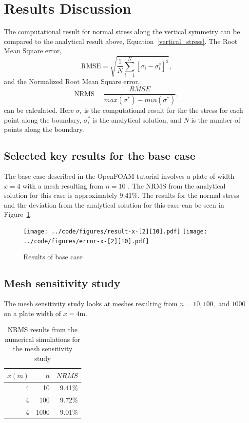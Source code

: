 \documentclass[twocolumn,10pt]{asme2ej}
\begin{document}
\section{Results Discussion}
The computational result for normal stress along the vertical symmetry can be compared to the analytical result above, Equation~\ref{vertical_stress}. The Root Mean Square error,
\begin{equation}
\mbox{RMSE} = \sqrt{\frac{1}{N}\sum\limits_{i=1}^N[\sigma_i - \sigma^*_i]^2},
\end{equation}
and the Normalized Root Mean Square error,
\begin{equation}
\mbox{NRMS} = \dfrac{RMSE}{max(\sigma^*)-min(\sigma^*)},
\end{equation}
can be calculated. Here $\sigma_i$ is the computational result for the the stress for each point along the boundary, $\sigma^*_i$ is the analytical solution, and $N$ is the number of points along the boundary.

\subsection{Selected key results for the base case}
The base case described in the OpenFOAM tutorial involves a plate of width $x = 4$ with a mesh resulting from $n = 10$ \cite{ctfm_1}. The NRMS from the analytical solution for this case is approximately 9.41\%. The results for the normal stress and the deviation from the analytical solution for this case can be seen in Figure~\ref{base_study}.

\begin{figure}[b]
\begin{center}
\texttt{[image: ../code/figures/result-x-[2][10].pdf]}
\texttt{[image: ../code/figures/error-x-[2][10].pdf]}
\caption{Results of base case}
\label{base_study}
\end{center}
\end{figure}

\subsection{Mesh sensitivity study}
The mesh sensitivity study looks at meshes resulting from $n = 10, 100, $ and $1000$ on a plate width of $x = 4$m.

\begin{table}[htb]
\begin{center}
\label{mesh_table}
\begin{tabular}{|r | r r|}
\hline
$x (m)$ & $n$ & $NRMS$ \\
\hline
4 & 10   & 9.41\%\\
4 & 100  & 9.72\%\\
4 & 1000 & 9.01\%\\
\hline
\end{tabular}
\caption{NRMS results from the numerical simulations for the mesh sensitivity study}
\end{center}
\end{table}
\end{document}
